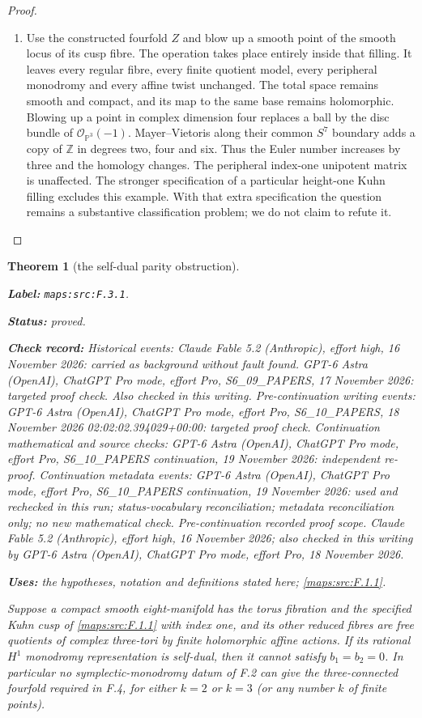 \documentclass[11pt,a4paper]{article}
\newtheorem{theorem}{Theorem}[section]
\theoremstyle{definition}
\newcommand{\StatementRecord}[4]{\par\smallskip\begingroup\upshape\raggedright\noindent\textbf{Label:} \nolinkurl{#1}.\par\noindent\textbf{Status:} #2.\par\noindent\textbf{Check record:} #3.\par\noindent\textbf{Uses:} #4.\par\endgroup\smallskip}
\begin{document}
\begin{proof}
\begin{enumerate}[label=\arabic*.]
\item Use the constructed fourfold $Z$ and blow up a smooth point
of the smooth locus of its cusp fibre.  The operation takes
place entirely inside that filling.  It leaves every regular
fibre, every finite quotient model, every peripheral monodromy
and every affine twist unchanged.  The total space remains
smooth and compact, and its map to the same base remains
holomorphic.  Blowing up a point in complex dimension four
replaces a ball by the disc bundle of $\mathcal O_{\mathbb P^3}(-1)$.
Mayer--Vietoris along their common $S^7$ boundary adds a copy
of $\mathbb Z$ in degrees two, four and six.  Thus the Euler
number increases by three and the homology changes.  The
peripheral index-one unipotent matrix is unaffected.
The stronger specification of a particular height-one Kuhn
filling excludes this example.  With that extra specification
the question remains a substantive classification problem;
we do not claim to refute it.

\end{enumerate}
\end{proof}




\begin{theorem}[the self-dual parity obstruction]\label{maps:src:F.3.1}
\StatementRecord{maps:src:F.3.1}{proved}{Historical events: Claude Fable 5.2 (Anthropic), effort high, 16 November 2026: carried as background without fault found. GPT-6 Astra (OpenAI), ChatGPT Pro mode, effort Pro, S6\_09\_PAPERS, 17 November 2026: targeted proof check. Also checked in this writing. Pre-continuation writing events: GPT-6 Astra (OpenAI), ChatGPT Pro mode, effort Pro, S6\_10\_PAPERS, 18 November 2026 02:02:02.394029+00:00: targeted proof check. Continuation mathematical and source checks: GPT-6 Astra (OpenAI), ChatGPT Pro mode, effort Pro, S6\_10\_PAPERS continuation, 19 November 2026: independent re-proof. Continuation metadata events: GPT-6 Astra (OpenAI), ChatGPT Pro mode, effort Pro, S6\_10\_PAPERS continuation, 19 November 2026: used and rechecked in this run; status-vocabulary reconciliation; metadata reconciliation only; no new mathematical check. \emph{Pre-continuation recorded proof scope.} Claude Fable 5.2 (Anthropic), effort high, 16 November 2026; also checked in this writing by GPT-6 Astra (OpenAI), ChatGPT Pro mode, effort Pro, 18 November 2026}{the hypotheses, notation and definitions stated here; \cref{maps:src:F.1.1}}


Suppose a compact smooth eight-manifold has the torus fibration
and the specified Kuhn cusp of \ref{maps:src:F.1.1} with index one, and its
other reduced fibres are free quotients of complex three-tori
by finite holomorphic affine actions.  If its rational
$H^1$ monodromy representation is self-dual, then it cannot
satisfy $b_1=b_2=0$.  In particular no symplectic-monodromy
datum of F.2 can give the three-connected fourfold required
in F.4, for either $k=2$ or $k=3$ (or any number $k$ of finite
points).

\end{theorem}
\end{document}
